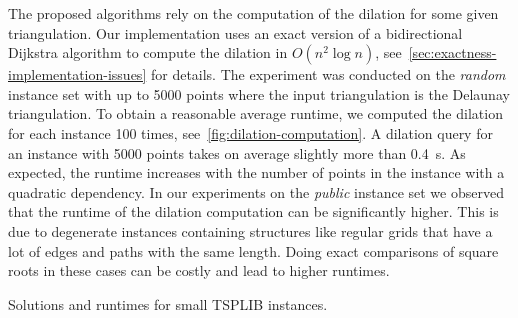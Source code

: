 The proposed algorithms rely on the computation of the dilation for some given triangulation.
Our implementation uses an exact version of a bidirectional Dijkstra algorithm to compute the dilation in $O(n^2 \log n)$, see~\cref{sec:exactness-implementation-issues} for details.
The experiment was conducted on the \emph{random} instance set with up to \num{5000} points where the input triangulation is the Delaunay triangulation.
To obtain a reasonable average runtime, we computed the dilation for each instance \num{100} times, see~\cref{fig:dilation-computation}.
A dilation query for an instance with \num{5000} points takes on average slightly more than \qty{0.4}{s}.
As expected, the runtime increases with the number of points in the instance with a quadratic dependency.
In our experiments on the \emph{public} instance set we observed that the runtime of the dilation computation can be significantly higher. This is due to degenerate instances containing structures like regular grids that have a lot of edges and paths with the same length.
Doing exact comparisons of square roots in these cases can be costly and lead to higher runtimes.



\begin{table}[h!t]
    \centering
    
    \caption{Solutions and runtimes for small TSPLIB instances.}
    \label{tab:tsplib-comparison}
\end{table}

